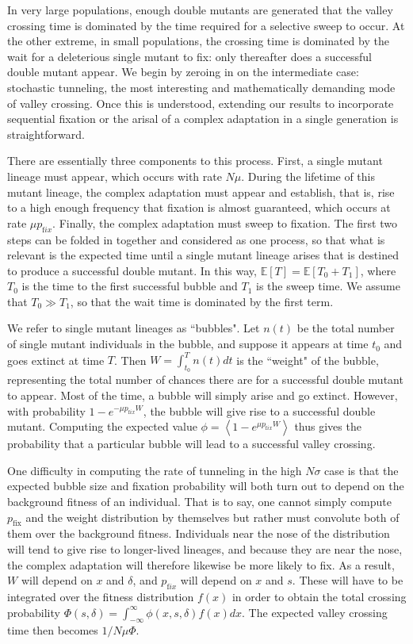 \documentclass[rmp]{revtex4}
\begin{document}
In very large populations, enough double mutants are generated that the valley crossing time is dominated by the time required for a selective sweep to occur.
At the other extreme, in small populations, the crossing time is dominated by the wait for a deleterious single mutant to fix: only thereafter does a successful double mutant appear.
We begin by zeroing in on the intermediate case: stochastic tunneling, the most interesting and mathematically demanding mode of valley crossing.
Once this is understood, extending our results to incorporate sequential fixation or the arisal of a complex adaptation in a single generation is straightforward.

There are essentially three components to this process.
First, a single mutant lineage must appear, which occurs with rate $N\mu$.
During the lifetime of this mutant lineage, the complex adaptation must appear and establish, that is, rise to a high enough frequency that fixation is almost guaranteed, which occurs at rate $\mu p_{\mathrm fix}$.
Finally, the complex adaptation must sweep to fixation.
The first two steps can be folded in together and considered as one process, so that what is relevant is the expected time until a single mutant lineage arises that is destined to produce a successful double mutant.
In this way, $\mathbb{E}\left[ T \right] = \mathbb{E} \left[ T_0 + T_1 \right]$, where $T_0$ is the time to the first successful bubble and $T_1$ is the sweep time.
We assume that $T_0 \gg T_1$, so that the wait time is dominated by the first term.

We refer to single mutant lineages as ``bubbles".
Let $n(t)$ be the total number of single mutant individuals in the bubble, and suppose it appears at time $t_0$ and goes extinct at time $T$.
Then $W = \int_{t_0}^T n(t)dt$ is the ``weight" of the bubble, representing the total number of chances there are for a successful double mutant to appear.
Most of the time, a bubble will simply arise and go extinct.
However, with probability $1-e^{-\mu p_{\mathrm fix} W}$, the bubble will give rise to a successful double mutant.
Computing the expected value $\phi = \left< 1-e^{\mu p_{\mathrm fix} W} \right>$ thus gives the probability that a particular bubble will lead to a successful valley crossing.

One difficulty in computing the rate of tunneling in the high $N\sigma$ case is that the expected bubble size and fixation probability will both turn out to depend on the background fitness of an individual.
That is to say, one cannot simply compute $p_{\mathrm{fix}}$ and the weight distribution by themselves but rather must convolute both of them over the background fitness.
Individuals near the nose of the distribution will tend to give rise to longer-lived lineages, and because they are near the nose, the complex adaptation will therefore likewise be more likely to fix.
As a result, $W$ will depend on $x$ and $\delta$, and $p_{\mathrm fix}$ will depend on $x$ and $s$.
These will have to be integrated over the fitness distribution $f(x)$ in order to obtain the total crossing probability $\Phi(s,\delta) = \int_{-\infty}^\infty \phi(x,s,\delta) f(x) dx$.
The expected valley crossing time then becomes $1/N\mu\Phi$.
\end{document}

